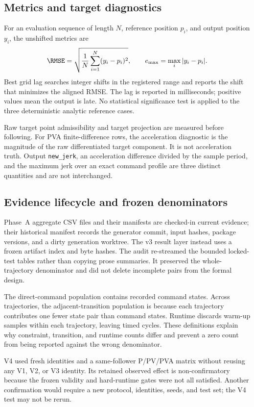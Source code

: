 \subsection{Metrics and target diagnostics}

For an evaluation sequence of length \(N\), reference position \(p_i\), and
output position \(y_i\), the unshifted metrics are
\[
  \RMSE =
  \sqrt{\frac{1}{N}\sum_{i=1}^{N}(y_i-p_i)^2},
  \qquad
  e_{\max}=\max_i |y_i-p_i|.
\]
Best grid lag searches integer shifts in the registered range and reports the
shift that minimizes the aligned RMSE.  The lag is reported in milliseconds;
positive values mean the output is late.  No statistical significance test is
applied to the three deterministic analytic reference cases.

Raw target point admissibility and target projection are measured before
following.
For PVA finite-difference rows, the acceleration diagnostic is the magnitude
of the raw differentiated target component.  It is not acceleration truth.
Output \texttt{new\_jerk}, an acceleration difference divided by the sample
period, and the maximum jerk over an exact command profile are three distinct
quantities and are not interchanged.

\subsection{Evidence lifecycle and frozen denominators}

Phase~A aggregate CSV files and their manifests are checked-in current
evidence; their historical manifest records the generator commit, input
hashes, package versions, and a dirty generation worktree.  The v3 result layer
instead uses a frozen artifact index and byte hashes.  The audit re-streamed
the bounded locked-test tables rather than copying prose summaries.  It
preserved the \VThreeTrajectoryCount{} whole-trajectory denominator and did not delete incomplete
pairs from the formal design.

The direct-command population contains \VThreeDirectCycleCount{} recorded
command states.  Across \VThreeTrajectoryCount{} trajectories, the
adjacent-transition population is \VThreeDirectTransitionCount{} because each
trajectory contributes one fewer state pair than command states.  Runtime
discards \VThreeRuntimeWarmupSamples{} warm-up samples within each trajectory,
leaving \VThreeRuntimeCycleCount{} timed cycles.  These definitions explain
why constraint, transition, and runtime counts differ and prevent a zero count
from being reported against the wrong denominator.

V4 used fresh identities and a same-follower P/PV/PVA matrix without
reusing any V1, V2, or V3 identity.  Its retained observed effect is
non-confirmatory because the frozen validity and hard-runtime gates were not
all satisfied.  Another confirmation would require a new protocol, identities,
seeds, and test set; the V4 test may not be rerun.
